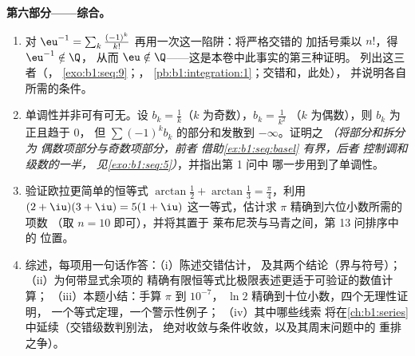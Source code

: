 \begin{problem}
\medskip
\noindent\textbf{第六部分——综合。}
\begin{enumerate}[resume]
  \item 对 $\eu^{-1} = \sum_k
        \frac{(-1)^k}{k!}$ 再用一次这一陷阱：将严格交错的
        加括号乘以 $n!$，得 $\eu^{-1} \notin \Q$，
        从而 $\eu \notin \Q$——这是本卷中此事实的第三种证明。
        列出这三者（，
        \cref{exo:b1:seq:9}；，
        \cref{pb:b1:integration:1}；交错和，此处），
        并说明各自所需的条件。
  \item 单调性并非可有可无。设
        $b_k = \frac1k$（$k$ 为奇数），$b_k = \frac{1}{k^2}$
        （$k$ 为偶数），则 $b_k$ 为正且趋于 $0$，
        但 $\sum (-1)^k b_k$ 的部分和发散到
        $-\infty$。证明之 \emph{（将部分和拆分为
        偶数项部分与奇数项部分，前者
        借助\cref{ex:b1:seq:basel} 有界，后者
        控制调和级数的一半，
        见\cref{exo:b1:seq:5}）}，并指出第 1 问中
        哪一步用到了单调性。
  \item 验证欧拉更简单的恒等式 $\arctan\frac12 +
        \arctan\frac13 = \frac\pi4$，利用 $(2 + \iu)(3 + \iu) =
        5(1 + \iu)$ 这一等式，估计求 $\pi$ 精确到六位小数所需的项数
        （取 $n = 10$ 即可），并将其置于
        莱布尼茨与马青之间，第 13 问排序中的
        位置。
  \item 综述，每项用一句话作答：（i）陈述交错估计，
        及其两个结论（界与符号）；（ii）为何带显式余项的
        精确有限恒等式比极限表述更适于可验证的数值计算；
        （iii）本题小结：手算 $\pi$ 到 $10^{-7}$，
        $\ln 2$ 精确到十位小数，四个无理性证明，
        一个等式定理，一个警示性例子；
        （iv）其中哪些线索
        将在\cref{ch:b1:series}中延续（交错级数判别法，
        绝对收敛与条件收敛，以及其周末问题中的
        重排之争）。
\end{enumerate}
\end{problem}
